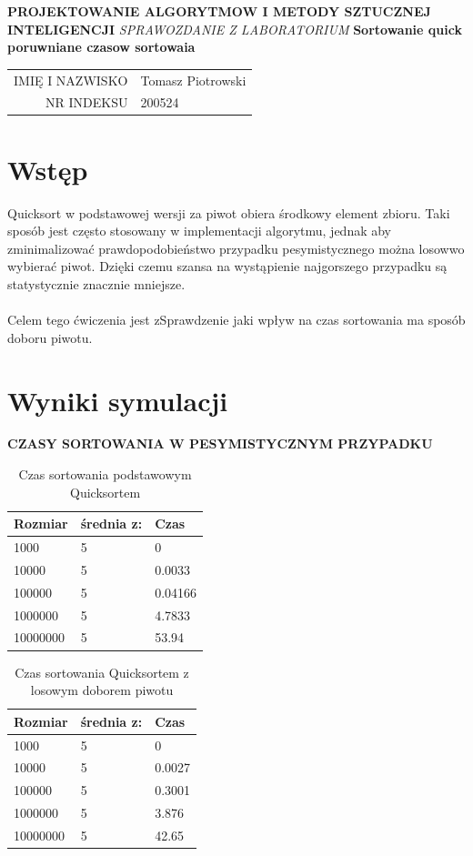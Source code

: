 \documentclass[10pt,oneside]{mwbk}
\renewcommand {\maketitle}{
\begin {titlepage}
\begin {center}
	\LARGE
	\textbf {PROJEKTOWANIE ALGORYTMOW I METODY SZTUCZNEJ INTELIGENCJI}
	\newline
	\newline
	\textit {SPRAWOZDANIE Z  LABORATORIUM}
	\textbf{ Sortowanie quick poruwniane czasow sortowaia}
	\newline
	\begin{table}
	\begin{center}
	\begin{tabular}{rl}
	IMIĘ I NAZWISKO & Tomasz Piotrowski \\
	NR INDEKSU & 200524 \\	
	
	\end{tabular}

	\end{center}
	\end{table}
\end {center}
\end {titlepage}}
\begin{document}
\maketitle
\section{Wstęp}
	
	\indent Quicksort w podstawowej wersji za piwot obiera środkowy element zbioru. Taki sposób jest często stosowany w implementacji algorytmu, jednak aby zminimalizować prawdopodobieństwo przypadku pesymistycznego można losowwo wybierać piwot. Dzięki czemu szansa na wystąpienie najgorszego przypadku są statystycznie znacznie mniejsze.\\
	\\
	\indent Celem tego ćwiczenia jest zSprawdzenie jaki wpływ na czas sortowania ma sposób doboru piwotu.
\newpage	
\section {Wyniki symulacji}

	\textbf{CZASY SORTOWANIA W PESYMISTYCZNYM PRZYPADKU}
	\\

	\begin{table}[!h]
	\centering
	\begin{tabular}{| l | l | l |}
	\hline
	Rozmiar & średnia z: & Czas         \\ \hline
1000&5&0\\ \hline
10000&5&0.0033\\ \hline
100000&5&0.04166\\ \hline
1000000&5&4.7833\\ \hline
10000000&5&53.94\\ \hline
	\end{tabular}
	\caption{Czas sortowania podstawowym Quicksortem}
	\end{table}
	
	
	\begin{table}[!h]
	\centering
	\begin{tabular}{| l | l | l |}
	\hline
		Rozmiar & średnia z: & Czas         \\ \hline
1000&5&0\\ \hline
10000&5&0.0027\\ \hline
100000&5&0.3001\\ \hline
1000000&5&3.876\\ \hline
10000000&5&42.65\\ \hline
	\end{tabular}
		\caption{Czas sortowania Quicksortem z losowym doborem piwotu}
	\end{table}
	
\end{document}
